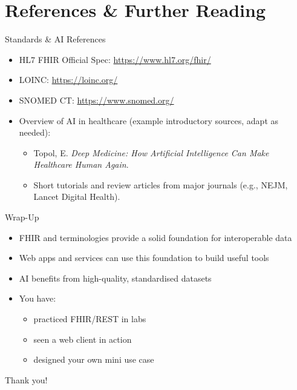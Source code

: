 \documentclass[aspectratio=1610]{beamer}
\begin{document}
	\section{References \& Further Reading}
	
	\begin{frame}{Standards \& AI References}
		\small
		\begin{itemize}
			\item HL7 FHIR Official Spec: \url{https://www.hl7.org/fhir/}
			\item LOINC: \url{https://loinc.org/}
			\item SNOMED CT: \url{https://www.snomed.org/}
			\item Overview of AI in healthcare (example introductory sources, adapt as needed):
			\begin{itemize}
				\item Topol, E. \emph{Deep Medicine: How Artificial Intelligence Can Make Healthcare Human Again}.
				\item Short tutorials and review articles from major journals (e.g., NEJM, Lancet Digital Health).
			\end{itemize}
		\end{itemize}
	\end{frame}
	
	\begin{frame}{Wrap-Up}
		\begin{itemize}
			\item FHIR and terminologies provide a solid foundation for interoperable data
			\item Web apps and services can use this foundation to build useful tools
			\item AI benefits from high-quality, standardised datasets
			\item You have:
			\begin{itemize}
				\item practiced FHIR/REST in labs
				\item seen a web client in action
				\item designed your own mini use case
			\end{itemize}
		\end{itemize}
		\vspace{0.5em}
		\centering
		\Large Thank you!
	\end{frame}
	
	
\end{document}
